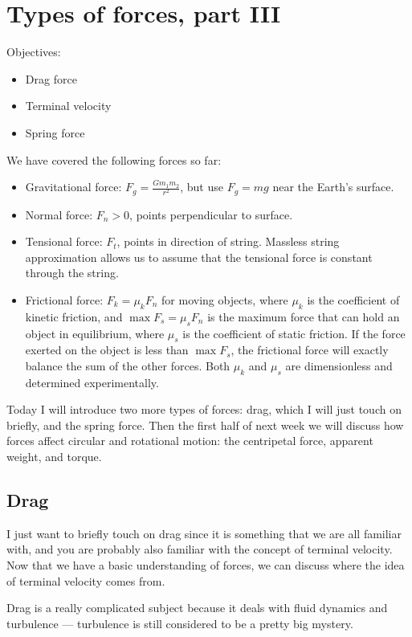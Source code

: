 \section{Types of forces, part III}
Objectives:
\begin{itemize}
\item Drag force
\item Terminal velocity
\item Spring force
\end{itemize}

\hrulefill

We have covered the following forces so far:
\begin{itemize}
\item Gravitational force: $F_g=\frac{Gm_1m_2}{r^2}$, but use $F_g=mg$ near the Earth's surface.
\item Normal force: $F_n>0$, points perpendicular to surface.
\item Tensional force: $F_t$, points in direction of string. Massless string approximation allows us to assume that the tensional force is constant through the string.
\item Frictional force: $F_k=\mu_kF_n$ for moving objects, where $\mu_k$ is the coefficient of kinetic friction, and $\max F_s=\mu_sF_n$ is the maximum force that can hold an object in equilibrium, where $\mu_s$ is the coefficient of static friction. If the force exerted on the object is less than $\max F_s$, the frictional force will exactly balance the sum of the other forces. Both $\mu_k$ and $\mu_s$ are dimensionless and determined experimentally.
\end{itemize}

Today I will introduce two more types of forces: drag, which I will just touch on briefly, and the spring force. Then the first half of next week we will discuss how forces affect circular and rotational motion: the centripetal force, apparent weight, and torque. %

\subsection{Drag}
I just want to briefly touch on drag since it is something that we are all familiar with, and you are probably also familiar with the concept of terminal velocity. Now that we have a basic understanding of forces, we can discuss where the idea of terminal velocity comes from.

Drag is a really complicated subject because it deals with fluid dynamics and turbulence --- turbulence is still considered to be a pretty big mystery.

